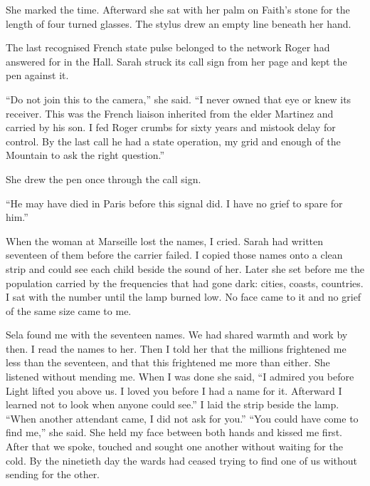 She marked the time. Afterward she sat with her palm on Faith's stone for the length of four turned glasses. The stylus drew an empty line beneath her hand.\par

The last recognised French state pulse belonged to the network Roger had answered for in the Hall. Sarah struck its call sign from her page and kept the pen against it.\par

``Do not join this to the camera,'' she said. ``I never owned that eye or knew its receiver. This was the French liaison inherited from the elder Martinez and carried by his son. I fed Roger crumbs for sixty years and mistook delay for control. By the last call he had a state operation, my grid and enough of the Mountain to ask the right question.''\par

She drew the pen once through the call sign.\par

``He may have died in Paris before this signal did. I have no grief to spare for him.''\par

When the woman at Marseille lost the names, I cried. Sarah had written seventeen of them before the carrier failed. I copied those names onto a clean strip and could see each child beside the sound of her. Later she set before me the population carried by the frequencies that had gone dark: cities, coasts, countries. I sat with the number until the lamp burned low. No face came to it and no grief of the same size came to me.\par

Sela found me with the seventeen names. We had shared warmth and work by then. I read the names to her. Then I told her that the millions frightened me less than the seventeen, and that this frightened me more than either. She listened without mending me. When I was done she said, ``I admired you before Light lifted you above us. I loved you before I had a name for it. Afterward I learned not to look when anyone could see.'' I laid the strip beside the lamp. ``When another attendant came, I did not ask for you.'' ``You could have come to find me,'' she said. She held my face between both hands and kissed me first. After that we spoke, touched and sought one another without waiting for the cold. By the ninetieth day the wards had ceased trying to find one of us without sending for the other.\par

